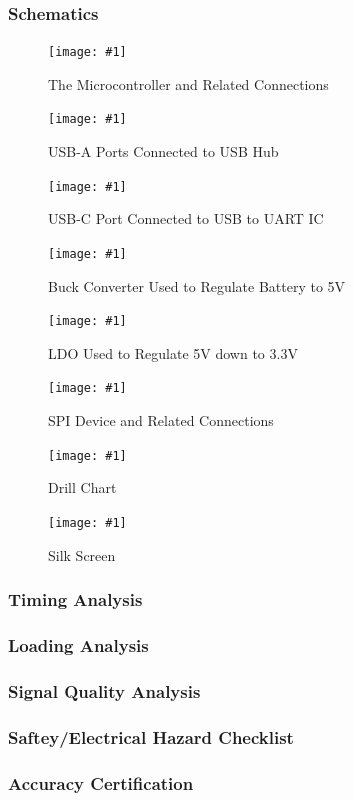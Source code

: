 \documentclass[12pt]{article}
\newcommand{\quickfigure}[4]{%
\begin{figure}[!htbp]
\centering
\texttt{[image: \#1]}
\caption{#3}
\label{#4}
\end{figure}%
}
\begin{document}
\subsubsection{Schematics}

\quickfigure{images/schematic/microcontroller.png}{15cm}{The Microcontroller and Related Connections}{microcontroller}

\quickfigure{images/schematic/USBA.png}{15cm}{USB-A Ports Connected to USB Hub}{usb-a}

\quickfigure{images/schematic/USBC.png}{15cm}{USB-C Port Connected to USB to UART IC}{usb-c}

\quickfigure{images/schematic/buck.png}{15cm}{Buck Converter Used to Regulate Battery to 5V}{buck}

\quickfigure{images/schematic/ldo.png}{15cm}{LDO Used to Regulate 5V down to 3.3V}{ldo}

\quickfigure{images/schematic/spi.png}{15cm}{SPI Device and Related Connections}{spi}

\quickfigure{images/drill-chart.png}{15cm}{Drill Chart}{drill-chart}

\quickfigure{images/silk-screen.png}{15cm}{Silk Screen}{silk-screen}

\newpage

\subsubsection{Timing Analysis}

\subsubsection{Loading Analysis}

\subsubsection{Signal Quality Analysis}

\subsubsection{Saftey/Electrical Hazard Checklist}

\subsubsection{Accuracy Certification}

\newpage
\end{document}
